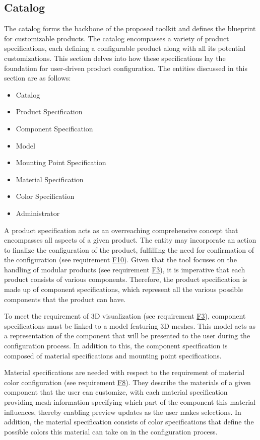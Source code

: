 \subsection{Catalog}

The catalog forms the backbone of the proposed toolkit and defines the blueprint for customizable products. The catalog encompasses a variety of product specifications, each defining a configurable product along with all its potential customizations. This section delves into how these specifications lay the foundation for user-driven product configuration.
The entities discussed in this section are as follows:
\begin{itemize}
    \item Catalog
    \item Product Specification
    \item Component Specification
    \item Model
    \item Mounting Point Specification
    \item Material Specification
    \item Color Specification
    \item Administrator
\end{itemize}

A product specification acts as an overreaching comprehensive concept that encompasses all aspects of a given product. The entity may incorporate an action to finalize the configuration of the product, fulfilling the need for confirmation of the configuration (see requirement \hyperref[itm:F10]{F10}). Given that the tool focuses on the handling of modular products (see requirement \hyperref[itm:F3]{F3}), it is imperative that each product consists of various components. Therefore, the product specification is made up of component specifications, which represent all the various possible components that the product can have.

To meet the requirement of 3D visualization (see requirement \hyperref[itm:F3]{F3}), component specifications must be linked to a model featuring 3D meshes. This model acts as a representation of the component that will be presented to the user during the configuration process. In addition to this, the component specification is composed of material specifications and mounting point specifications.

Material specifications are needed with respect to the requirement of material color configuration (see requirement \hyperref[itm:F8]{F8}). They describe the materials of a given component that the user can customize, with each material specification providing mesh information specifying which part of the component this material influences, thereby enabling preview updates as the user makes selections. In addition, the material specification consists of color specifications that define the possible colors this material can take on in the configuration process.


